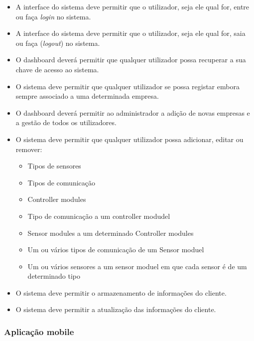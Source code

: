 \begin{itemize}
	\item A interface do sistema deve permitir que o utilizador, seja ele qual for, entre ou faça \textit{login} no sistema. 
	
	\item A interface do sistema deve permitir que o utilizador, seja ele qual for, saia ou faça (\textit{logout}) no sistema.
	
	\item O dashboard deverá permitir que qualquer utilizador possa recuperar a sua chave de acesso ao sistema.
	
	\item O sistema deve permitir que qualquer utilizador se possa registar embora sempre associado a uma determinada empresa. 
	
	\item O dashboard deverá permitir ao administrador a adição de novas empresas e a gestão de todos os utilizadores. 
	
	\item O sistema deve permitir que qualquer utilizador possa adicionar, editar ou remover: 
	\begin{itemize}
		\item Tipos de sensores 
		\item Tipos de comunicação 
		\item Controller modules
		\item Tipo de comunicação a um controller modudel
		\item Sensor modules a um determinado Controller modules
		\item Um ou vários tipos de comunicação de um Sensor moduel
		\item Um ou vários sensores a um sensor moduel em que cada sensor é de um determinado tipo 
		
	\end{itemize}
	
	\item O sistema deve permitir o armazenamento de informações do cliente.
	
	\item O sistema deve permitir a atualização das informações do cliente.
\end{itemize}


\subsubsection{Aplicação mobile}





